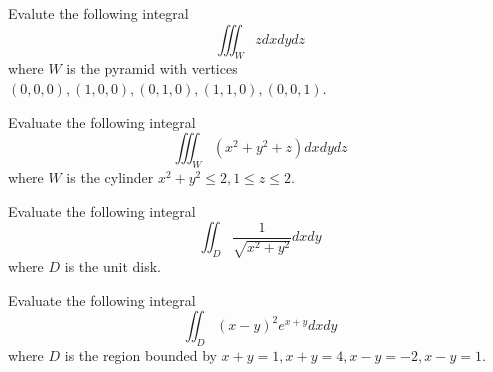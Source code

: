 \documentclass[openany]{book}
\begin{document}


\begin{prob}
    Evalute the following integral 
    \begin{equation*}
        \iiint_W zdxdydz
    \end{equation*}
    where $W$ is the pyramid with vertices $(0,0,0), (1,0,0), (0,1,0), (1,1,0), (0,0,1)$.
\end{prob}





\begin{prob}
    Evaluate the following integral
    \begin{equation*}
        \iiint_W(x^2+y^2+z)dxdydz
    \end{equation*}
    where $W$ is the cylinder $x^2+y^2\leq 2, 1\leq z\leq 2$.
\end{prob}



\begin{prob}
    Evaluate the following integral 
    \begin{equation*}
        \iint_D\frac{1}{\sqrt{x^2+y^2}}dxdy
    \end{equation*}
    where $D$ is the unit disk.
\end{prob}


\begin{prob}
    Evaluate the following integral 
    \begin{equation*}
        \iint_D (x-y)^2e^{x+y}dxdy
    \end{equation*}
    where $D$ is the region bounded by $x+y=1, x+y=4, x-y=-2, x-y=1$.
\end{prob}
\end{document}
